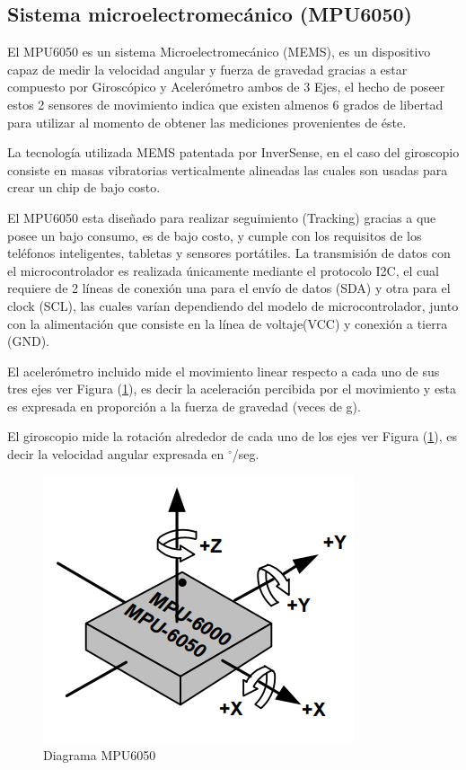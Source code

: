 \documentclass[12pt,a4paper]{article}
\newcommand{\grad}{$^{\circ}$}
\begin{document}
			\subsection{Sistema microelectromecánico (MPU6050)}
			El MPU6050\cite{MPU6050} es un sistema Microelectromecánico (MEMS), es un dispositivo capaz de medir la velocidad angular y fuerza de gravedad gracias a estar compuesto por Giroscópico y Acelerómetro ambos de 3 Ejes, el hecho de poseer estos 2 sensores de movimiento indica que existen almenos 6 grados de libertad para utilizar al momento de obtener las mediciones provenientes de éste.
			
			La tecnología utilizada MEMS patentada por InverSense, en el caso del giroscopio consiste en masas vibratorias verticalmente alineadas las cuales son usadas para crear un chip de bajo costo.
			
			El MPU6050 esta diseñado para realizar seguimiento (Tracking) gracias a que posee un bajo consumo, es de bajo costo, y cumple con los requisitos de los teléfonos inteligentes, tabletas y sensores portátiles.
			La transmisión de datos con el microcontrolador es realizada únicamente mediante el protocolo I2C, el cual requiere de 2 líneas de conexión una para el envío de datos (SDA) y otra para el clock (SCL), las cuales varían dependiendo del modelo de microcontrolador, junto con la alimentación que consiste en la línea de voltaje(VCC) y conexión a tierra (GND).
			
			El acelerómetro incluido mide el movimiento linear respecto a cada uno de sus tres ejes ver Figura (\ref{fig:MPU6050}), es decir la aceleración percibida por el movimiento y esta es expresada en proporción a la fuerza de gravedad (veces de g).
			
			El giroscopio mide la rotación alrededor de cada uno de los ejes ver Figura (\ref{fig:MPU6050}), es decir la velocidad angular expresada en \grad/seg.
			
			\begin{figure}[H]
				\centering
				\includegraphics[scale=0.5]{images/MPU6050}
				\caption{Diagrama MPU6050}
				\label{fig:MPU6050}
			\end{figure}
			
\end{document}
